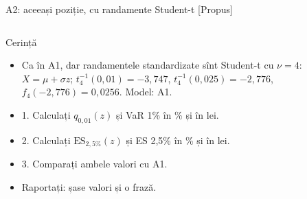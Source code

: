 \begin{frame}{A2: aceeași poziție, cu randamente Student-t [Propus]}
\propsub
\itemsize{\scriptsize}
\begin{columns}[T]
\begin{column}{\taskw}
\begin{block}{Cerință}
\begin{itemize}
    \item Ca în A1, dar randamentele standardizate sînt Student-t cu $\nu = 4$: $X = \mu + \sigma z$; $t_4^{-1}(0{,}01) = -3{,}747$, $t_4^{-1}(0{,}025) = -2{,}776$, $f_4(-2{,}776) = 0{,}0256$. Model: A1.
    \item 1. Calculați $q_{0{,}01}(z)$ și VaR 1\% în \% și în lei.
    \item 2. Calculați $\mathrm{ES}_{2,5\%}(z)$ și ES 2,5\% în \% și în lei.
    \item 3. Comparați ambele valori cu A1.
    \item Raportați: șase valori și o frază.
\end{itemize}
\end{block}
\end{column}
\begin{column}{\solw}
\end{column}
\end{columns}
\end{frame}

